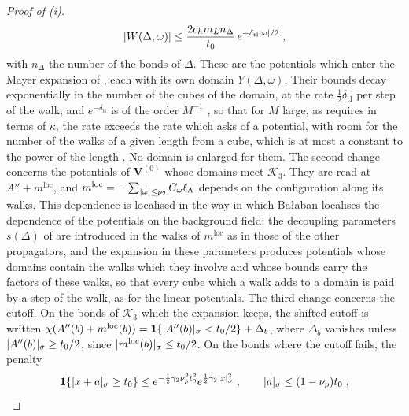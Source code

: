 \documentclass[11pt]{preprint}
\newcommand{\id}{\mathbf 1}
\DeclarePairedDelimiter{\abs}{\lvert}{\rvert}
\numberwithin{equation}{section}
\theoremstyle{definition}
\theoremstyle{remark}
\theoremstyle{plain}
\begin{document}
\begin{proof}[Proof of (i)]
\begin{equation}\label{eq:retreated-linear-bound}
    \abs{W(\Delta, \omega)} \leq \frac{2c_hm_Ln_\Delta}{t_0}\,e^{-\delta_{\mathrm{tl}}\abs\omega/2}\;,
\end{equation}
with $n_\Delta$ the number of the bonds of $\Delta$. These are the potentials which enter the Mayer expansion of \cite[(2.1)]{BalabanRG2}, each with its own domain $Y(\Delta, \omega)$. Their bounds decay exponentially in the number of the cubes of the domain, at the rate $\frac12\delta_{\mathrm{tl}}$ per step of the walk, and $e^{-\delta_{\mathrm{tl}}}$ is of the order $M^{-1}$ \cite[(3.108)]{BalabanPBG}, so that for $M$ large, as \cite[Theorem~3, p.~264]{BalabanRG1} requires in terms of $\kappa$, the rate exceeds the rate which \cite[(1.36), p.~9]{BalabanRG2} asks of a potential, with room for the number of the walks of a given length from a cube, which is at most a constant to the power of the length \cite[p.~413]{BalabanPBG}. No domain is enlarged for them. The second change concerns the potentials of $\mathbf V^{(0)}$ whose domains meet $\mathcal K_3$. They are read at $A'' + m^{\mathrm{loc}}$, and $m^{\mathrm{loc}} = -\sum_{\abs\omega \leq \rho_2}C_\omega\ell_\Lambda$ depends on the configuration along its walks. This dependence is localised in the way in which Ba{\l}aban localises the dependence of the potentials on the background field: the decoupling parameters $s(\Delta)$ of \cite[(1.6)--(1.10), pp.~3--4]{BalabanRG2} are introduced in the walks of $m^{\mathrm{loc}}$ as in those of the other propagators, and the expansion in these parameters produces potentials whose domains contain the walks which they involve and whose bounds carry the factors \cite[(1.7), p.~3]{BalabanRG2} of these walks, so that every cube which a walk adds to a domain is paid by a step of the walk, as for the linear potentials. The third change concerns the cutoff. On the bonds of $\mathcal K_3$ which the expansion keeps, the shifted cutoff is written $\chi(A''(b) + m^{\mathrm{loc}}(b)) = \id\{\abs{A''(b)}_\sigma < t_0/2\} + \Delta_b$, where $\Delta_b$ vanishes unless $\abs{A''(b)}_\sigma \geq t_0/2$, since $\abs{m^{\mathrm{loc}}(b)}_\sigma \leq t_0/2$. On the bonds where the cutoff fails, the penalty
\[
    \id\{\abs{x + a}_\sigma \geq t_0\} \leq e^{-\frac12\gamma_2\nu_p^2t_0^2}e^{\frac12\gamma_2\abs{x}_\sigma^2}\;,
    \qquad
    \abs{a}_\sigma \leq (1 - \nu_p)t_0\;,
\]

\end{proof}
\end{document}
